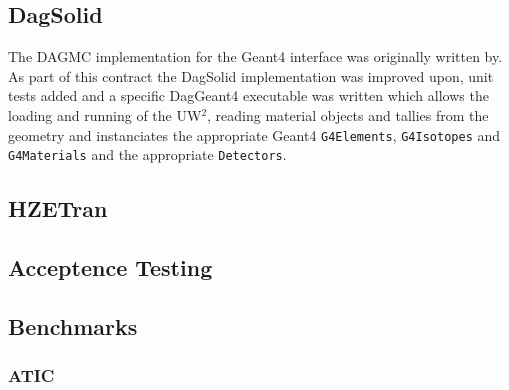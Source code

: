 \subsection{DagSolid}
The DAGMC implementation for the Geant4 interface was originally written by. As part of this contract the 
DagSolid implementation was improved upon, unit tests added and a specific DagGeant4 executable was written
which allows the loading and running of the UW$^2$, reading material objects and tallies from the geometry 
and instanciates the appropriate Geant4 \texttt{G4Elements}, \texttt{G4Isotopes} and \texttt{G4Materials} and the 
appropriate \texttt{Detectors}. 

\subsection{HZETran}

\subsection{Acceptence Testing}
\subsection{Benchmarks}
\subsubsection{ATIC}



